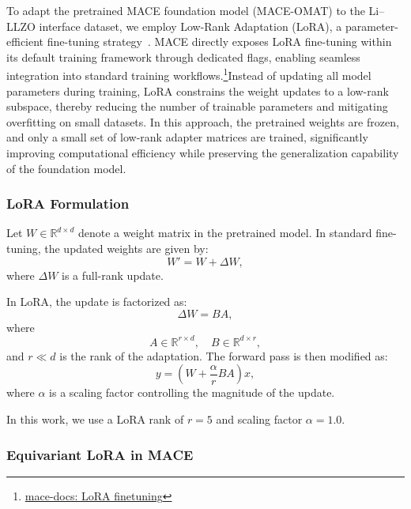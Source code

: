 \documentclass[12pt,a4paper,oneside]{book}
\begin{document}
To adapt the pretrained MACE foundation model (MACE-OMAT) to the Li--LLZO interface dataset, we employ Low-Rank Adaptation (LoRA), a parameter-efficient fine-tuning strategy~\cite{LoRA2021}. MACE directly exposes LoRA fine-tuning within its default training framework through dedicated flags, enabling seamless integration into standard training workflows.\footnote{\href{https://mace-docs.readthedocs.io/en/latest/guide/lora_finetuning.html}{mace-docs: LoRA finetuning}}Instead of updating all model parameters during training, LoRA constrains the weight updates to a low-rank subspace, thereby reducing the number of trainable parameters and mitigating overfitting on small datasets. In this approach, the pretrained weights are frozen, and only a small set of low-rank adapter matrices are trained, significantly improving computational efficiency while preserving the generalization capability of the foundation model.

\subsubsection{LoRA Formulation}

Let $W \in \mathbb{R}^{d \times d}$ denote a weight matrix in the pretrained model. In standard fine-tuning, the updated weights are given by:
\begin{equation}
W' = W + \Delta W,
\end{equation}
where $\Delta W$ is a full-rank update.

In LoRA, the update is factorized as:
\begin{equation}
\Delta W = BA,
\end{equation}
where
\begin{equation}
A \in \mathbb{R}^{r \times d}, \quad B \in \mathbb{R}^{d \times r},
\end{equation}
and $r \ll d$ is the rank of the adaptation. The forward pass is then modified as:
\begin{equation}
y = \left(W + \frac{\alpha}{r} BA \right) x,
\end{equation}
where $\alpha$ is a scaling factor controlling the magnitude of the update.

In this work, we use a LoRA rank of $r = 5$ and scaling factor $\alpha = 1.0$.

\subsubsection{Equivariant LoRA in MACE}
\end{document}
